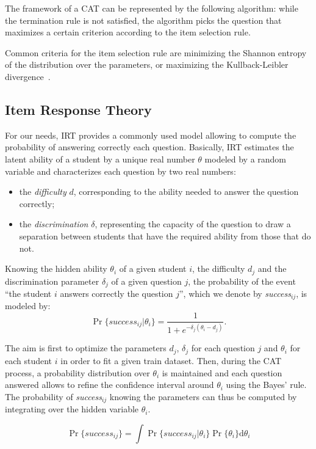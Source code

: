 \documentclass{sig-alternate}
\begin{document}
The framework of a CAT can be represented by the following algorithm: while the termination rule is not satisfied, the algorithm picks the question that maximizes a certain criterion according to the item selection rule.

Common criteria for the item selection rule are minimizing the Shannon entropy of the distribution over the parameters, or maximizing the Kullback-Leibler divergence~\citep{Xu2003}. %

\subsection{Item Response Theory}

For our needs, IRT provides a commonly used model allowing to compute the probability of answering correctly each question. Basically, IRT estimates the latent ability of a student by a unique real number $\theta$ modeled by a random variable and characterizes each question by two real numbers:

\begin{itemize}
\item the \emph{difficulty} $d$, corresponding to the ability needed to answer the question correctly;
\item the \emph{discrimination} $\delta$, representing the capacity of the question to draw a separation between students that have the required ability from those that do not.
\end{itemize}

Knowing the hidden ability $\theta_i$ of a given student $i$, the difficulty $d_j$ and the discrimination parameter $\delta_j$ of a given question $j$, the probability of the event ``the student $i$ answers correctly the question $j$'', which we denote by \emph{success}$_{ij}$, is modeled by:
\[ \Pr\{success_{ij}|\theta_i\} = \frac1{1+e^{-\delta_j(\theta_i - d_j)}}. \]

The aim is first to optimize the parameters $d_j$, $\delta_j$ for each question $j$ and $\theta_i$ for each student $i$ in order to fit a given train dataset. Then, during the CAT process, a probability distribution over $\theta_i$ is maintained and each question answered allows to refine the confidence interval around $\theta_i$ using the Bayes' rule. The probability of \emph{success}$_{ij}$ knowing the parameters can thus be computed by integrating over the hidden variable $\theta_i$.

\[ \Pr\{success_{ij}\} = \int \Pr\{success_{ij}|\theta_i\} \Pr\{\theta_i\} \mathrm d\theta_i \]
\end{document}
